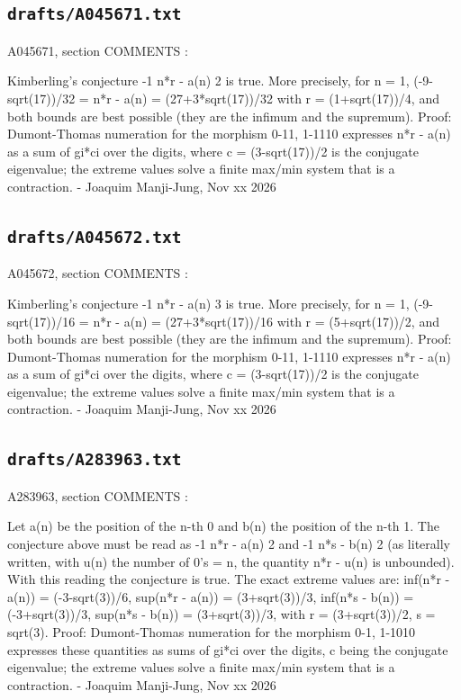 \subsection*{\texttt{drafts/A045671.txt}}
{\small\raggedright\ttfamily
A045671, section COMMENTS :\par
\par
Kimberling's conjecture -1  n*r - a(n)  2 is true. More precisely, for n = 1, (-9-sqrt(17))/32 = n*r - a(n) = (27+3*sqrt(17))/32 with r = (1+sqrt(17))/4, and both bounds are best possible (they are the infimum and the supremum). Proof: Dumont-Thomas numeration for the morphism 0-11, 1-1110 expresses n*r - a(n) as a sum of gi*ci over the digits, where c = (3-sqrt(17))/2 is the conjugate eigenvalue; the extreme values solve a finite max/min system that is a contraction. - Joaquim Manji-Jung, Nov xx 2026\par
}
\subsection*{\texttt{drafts/A045672.txt}}
{\small\raggedright\ttfamily
A045672, section COMMENTS :\par
\par
Kimberling's conjecture -1  n*r - a(n)  3 is true. More precisely, for n = 1, (-9-sqrt(17))/16 = n*r - a(n) = (27+3*sqrt(17))/16 with r = (5+sqrt(17))/2, and both bounds are best possible (they are the infimum and the supremum). Proof: Dumont-Thomas numeration for the morphism 0-11, 1-1110 expresses n*r - a(n) as a sum of gi*ci over the digits, where c = (3-sqrt(17))/2 is the conjugate eigenvalue; the extreme values solve a finite max/min system that is a contraction. - Joaquim Manji-Jung, Nov xx 2026\par
}
\subsection*{\texttt{drafts/A283963.txt}}
{\small\raggedright\ttfamily
A283963, section COMMENTS :\par
\par
Let a(n) be the position of the n-th 0 and b(n) the position of the n-th 1. The conjecture above must be read as -1  n*r - a(n)  2 and -1  n*s - b(n)  2 (as literally written, with u(n) the number of 0's = n, the quantity n*r - u(n) is unbounded). With this reading the conjecture is true. The exact extreme values are: inf(n*r - a(n)) = (-3-sqrt(3))/6, sup(n*r - a(n)) = (3+sqrt(3))/3, inf(n*s - b(n)) = (-3+sqrt(3))/3, sup(n*s - b(n)) = (3+sqrt(3))/3, with r = (3+sqrt(3))/2, s = sqrt(3). Proof: Dumont-Thomas numeration for the morphism 0-1, 1-1010 expresses these quantities as sums of gi*ci over the digits, c being the conjugate eigenvalue; the extreme values solve a finite max/min system that is a contraction. - Joaquim Manji-Jung, Nov xx 2026\par
}
